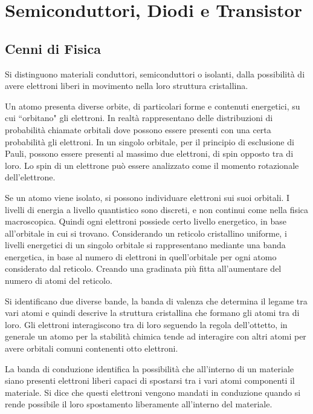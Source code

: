 \documentclass{article}
\numberwithin{equation}{subsection}
\begin{document}
\clearpage

\section{Semiconduttori, Diodi e Transistor}

\subsection{Cenni di Fisica}

Si distinguono materiali conduttori, semiconduttori o isolanti, dalla possibilità di avere elettroni liberi in movimento nella loro struttura cristallina.  

Un atomo presenta diverse orbite, di particolari forme e contenuti energetici, su cui ``orbitano" gli elettroni. In realtà rappresentano delle distribuzioni di probabilità 
chiamate orbitali dove possono essere presenti con una certa probabilità gli elettroni. In un singolo orbitale, per il principio di esclusione di Pauli, possono essere 
presenti al massimo due elettroni, di spin opposto tra di loro. Lo spin di un elettrone può essere analizzato come il momento rotazionale dell'elettrone. 


Se un atomo viene isolato, si possono individuare elettroni sui suoi orbitali. I livelli di energia a livello quantistico sono discreti, e non continui 
come nella fisica macroscopica. Quindi ogni elettroni possiede certo livello energetico, in base all'orbitale in cui si trovano. Considerando un reticolo cristallino uniforme, 
i livelli energetici di un singolo orbitale si rappresentano mediante una banda energetica, in base al numero di elettroni in quell'orbitale per ogni atomo considerato 
dal reticolo. Creando una gradinata più fitta all'aumentare del numero di atomi del reticolo. 

Si identificano due diverse bande, la banda di valenza che determina il legame tra vari atomi e quindi descrive la struttura cristallina che formano gli atomi 
tra di loro. Gli elettroni interagiscono tra di loro seguendo la regola dell'ottetto, in generale un atomo per la stabilità chimica tende ad interagire con altri atomi per 
avere orbitali comuni contenenti otto elettroni. 

La banda di conduzione identifica la possibilità che all'interno di un materiale siano presenti elettroni liberi capaci di spostarsi tra i vari atomi componenti il 
materiale. Si dice che questi elettroni vengono mandati in conduzione quando si rende possibile il loro spostamento liberamente all'interno del materiale.  
\end{document}
